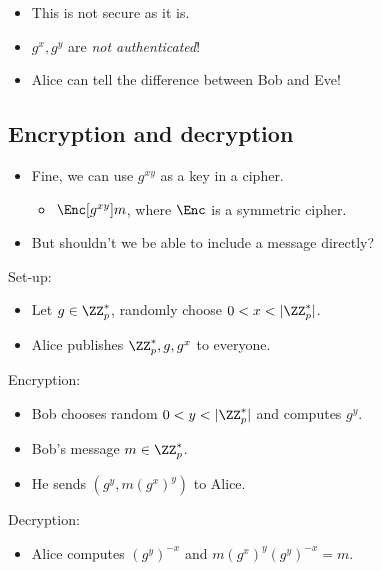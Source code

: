 \begin{frame}
  \begin{remark}
    \begin{itemize}
      \item This is not secure as it is.
      \item \(g^x, g^y\) are \emph{not authenticated}!
      \item Alice can tell the difference between Bob and Eve!
    \end{itemize}
  \end{remark}
\end{frame}

\subsection{Encryption and decryption}

\begin{frame}
  \begin{idea}
    \begin{itemize}
      \item Fine, we can use \(g^{xy}\) as a key in a cipher.
        \begin{itemize}
          \item \(\Enc[g^{xy}]{m}\), where \(\Enc\) is a symmetric cipher.
        \end{itemize}
      \item But shouldn't we be able to include a message directly?
    \end{itemize}
  \end{idea}
\end{frame}

\begin{frame}
  \begin{definition}
    Set-up:
    \begin{itemize}
      \item Let \(g\in \ZZ_p^*\), randomly choose \(0 < x < |\ZZ_p^*|\).
      \item Alice publishes \(\ZZ_p^*, g, g^x\) to everyone.
    \end{itemize}
    Encryption:
    \begin{itemize}
      \item Bob chooses random \(0 < y < |\ZZ_p^*|\) and computes \(g^y\).
      \item Bob's message \(m\in \ZZ_p^*\).
      \item He sends \((g^y, m(g^{x})^y)\) to Alice.
    \end{itemize}
    Decryption:
    \begin{itemize}
      \item Alice computes \((g^y)^{-x}\) and \(m(g^x)^y (g^{y})^{-x} = m\).
    \end{itemize}
  \end{definition}
\end{frame}

